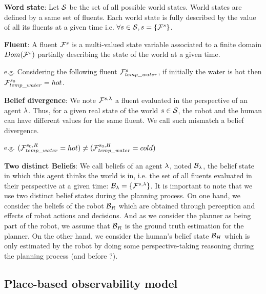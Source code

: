 \documentclass[letterpaper]{article} %
\begin{document}
\textbf{Word state}: 
Let $\mathcal{S}$ be the set of all possible world states. World states are defined by a same set of fluents. Each world state is fully described by the value of all its fluents at a given time i.e. $\forall s\in\mathcal{S}, s=\{ \mathcal{F}^{s}_{}{} \}$.

\textbf{Fluent}: 
A fluent $\mathcal{F}^{s}_{}{}$ is a multi-valued state variable associated to a finite domain $Dom(\mathcal{F}^{s}_{}{})$ partially describing the state of the world at a given time.


e.g. Considering the following fluent $\mathcal{F}^{s}_{temp\_water}{}$, if initially the water is hot then $\mathcal{F}^{s_0}_{temp\_water}{}=hot$.

\textbf{Belief divergence}: 
We note $\mathcal{F}^{s,\lambda}_{}{}$ a fluent evaluated in the perspective of an agent $\lambda$. Thus, for a given real state of the world $s\in\mathcal{S}$, the robot and the human can have different values for the same fluent. We call such mismatch a belief divergence.

e.g. $(\mathcal{F}^{s_0,R}_{temp\_water}{}=hot) \neq (\mathcal{F}^{s_0,H}_{temp\_water}{}=cold)$

\textbf{Two distinct Beliefs}: 
We call beliefs of an agent $\lambda$, noted $\mathcal{B}_\lambda$, the belief state in which this agent thinks the world is in, i.e. the set of all fluents evaluated in their perspective at a given time: $\mathcal{B}_\lambda=\{ \mathcal{F}^{s,\lambda}_{}{} \}$. It is important to note that we use two distinct belief states during the planning process. On one hand, we consider the beliefs of the robot $\mathcal{B}_R$ which are obtained through perception and effects of robot actions and decisions. And as we consider the planner as being part of the robot, we assume that $\mathcal{B}_R$ is the ground truth estimation for the planner. On the other hand, we consider the human's belief state $\mathcal{B}_H$ which is only estimated by the robot by doing some perspective-taking reasoning during the planning process (and before ?).

\subsection{Place-based observability model}
\end{document}
